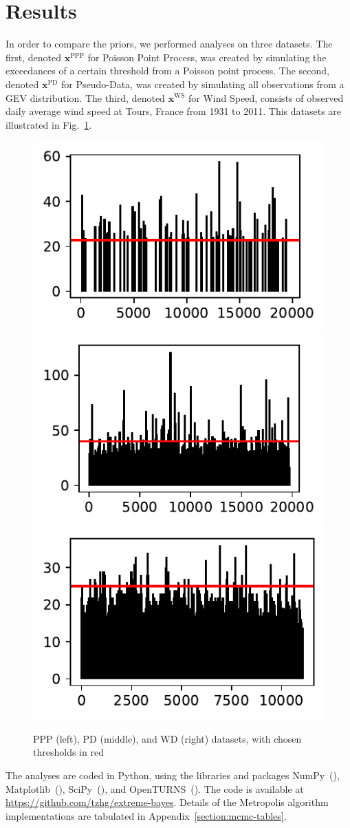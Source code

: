 \documentclass{article}
\begin{document}
\section{Results}
\label{section:studies}
%



%
In order to compare the priors, we performed analyses on three
datasets.
The first, denoted $\mathbf{x}^{\text{PPP}}$ for Poisson Point Process,
was created by simulating the exceedances of a certain threshold
from a Poisson point process.
The second, denoted $\mathbf{x}^{\text{PD}}$ for Pseudo-Data,
was created by simulating all observations
from a GEV distribution.
The third, denoted $\mathbf{x}^{\text{WS}}$ for Wind Speed,
consists of observed daily average wind speed at Tours, France from 1931 to 2011.
This datasets are illustrated in Fig.~\ref{fig:data}.
%
\begin{figure}
	\centering
	\includegraphics[width=0.32\linewidth]{plots/ppp-data.pdf}
	\includegraphics[width=0.32\linewidth]{plots/pd-data.pdf}
	\includegraphics[width=0.32\linewidth]{plots/ws-data.pdf}
	\caption{PPP (left), PD (middle), and WD (right) datasets, with
		chosen thresholds in red}
	\label{fig:data}
\end{figure}
%

%
The analyses are coded in Python, using the libraries and packages
NumPy~(\cite{numpy}), Matplotlib~(\cite{matplotlib}),
SciPy~(\cite{scipy}), and OpenTURNS~(\cite{OpenTURNS}).
The code is available at \url{https://github.com/tzhg/extreme-bayes}.
Details of the Metropolis algorithm implementations
are tabulated in Appendix~\ref{section:mcmc-tables}.
%
\end{document}
